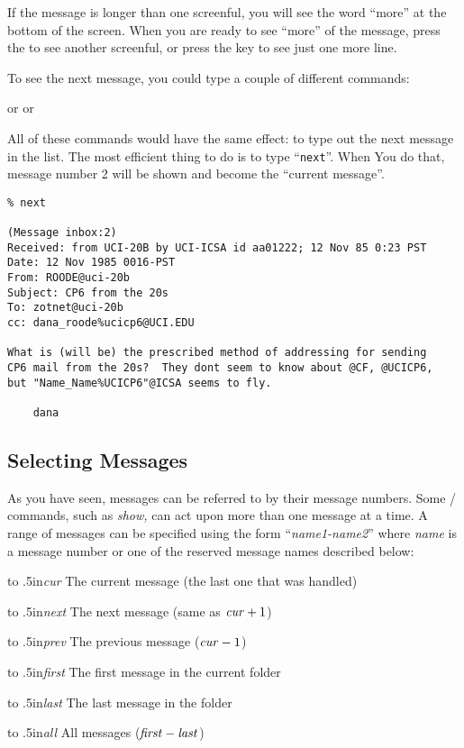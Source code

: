 If the message is
longer than one screenful, you will see the word ``more'' at the bottom
of the screen.  When you are ready to see ``more'' of the message,
press the  to see another screenful, or press the 
 key to see just one more line.

To see the next message, you could type a couple of different commands:


or
or

All of these commands would have the same effect: to type out the next message
in the list.  The most efficient thing to do is to type ``{\tt next}''.  When
You do that, message number 2 will be shown and become the ``current message''.

\begin{footnotesize}
\begin{verbatim}
% next

(Message inbox:2)
Received: from UCI-20B by UCI-ICSA id aa01222; 12 Nov 85 0:23 PST
Date: 12 Nov 1985 0016-PST
From: ROODE@uci-20b
Subject: CP6 from the 20s
To: zotnet@uci-20b
cc: dana_roode%ucicp6@UCI.EDU

What is (will be) the prescribed method of addressing for sending
CP6 mail from the 20s?  They dont seem to know about @CF, @UCICP6,
but "Name_Name%UCICP6"@ICSA seems to fly.

	dana
\end{verbatim}
\end{footnotesize}

\subsection{Selecting Messages}

As you have seen, messages can be referred to by their message numbers.
Some \MH/ commands, such as {\it show,} can act upon more than one
message at a time. A range of messages can be specified using the
form ``{\it name1-name2\/}'' where {\it name\/} is a message number or
one of the reserved message names described below:

\bigskip

\def\titem[#1]{\par\noindent\hbox to .5in{\hfil\it #1\/}\qquad}

\titem[cur] The current message (the last one that was handled)
\titem[next] The next message (same as ${\it cur\/} + 1$)
\titem[prev] The previous message (${\it cur\/} - 1$)
\titem[first] The first message in the current folder
\titem[last] The last message in the folder
\titem[all] All messages ($\it first-last$)

